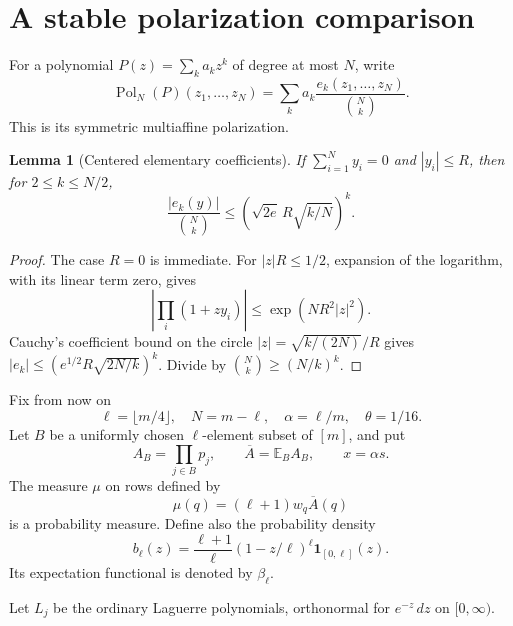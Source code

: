\documentclass[11pt]{article}
\newtheorem{lemma}{Lemma}
\newcommand{\E}{\mathbb E}
\newcommand{\Pol}{\operatorname{Pol}}
\begin{document}
\section*{A stable polarization comparison}
For a polynomial $P(z)=\sum_k a_kz^k$ of degree at most $N$, write
\[
 \Pol_N(P)(z_1,\ldots,z_N)
    =\sum_k a_k\frac{e_k(z_1,\ldots,z_N)}{\binom Nk}.
\]
This is its symmetric multiaffine polarization.

\begin{lemma}[Centered elementary coefficients]\label{elementary}
If $\sum_{i=1}^Ny_i=0$ and $|y_i|\le R$, then for $2\le k\le N/2$,
\[
 \frac{|e_k(y)|}{\binom Nk}
       \le \left(\sqrt{2e}\,R\sqrt{k/N}\right)^k.
\]
\end{lemma}
\begin{proof}
The case $R=0$ is immediate. For $|z|R\le1/2$, expansion of the
logarithm, with its linear term zero, gives
\[
 \left|\prod_i(1+zy_i)\right|\le \exp(NR^2|z|^2).
\]
Cauchy's coefficient bound on the circle
$|z|=\sqrt{k/(2N)}/R$ gives
$|e_k|\le(e^{1/2}R\sqrt{2N/k})^k$.
Divide by $\binom Nk\ge(N/k)^k$.
\end{proof}

Fix from now on
\[
 \ell=\lfloor m/4\rfloor,\quad N=m-\ell,\quad
 \alpha=\ell/m,\quad \theta=1/16.
\]
Let $B$ be a uniformly chosen $\ell$-element subset of $[m]$, and put
\[
 A_B=\prod_{j\in B}p_j,\qquad \overline A=\E_B A_B,
 \qquad x=\alpha s.
\]
The measure $\mu$ on rows defined by
\[
 \mu(q)=(\ell+1)w_q\overline A(q)
\]
is a probability measure. Define also the probability density
\[
 b_\ell(z)=\frac{\ell+1}{\ell}(1-z/\ell)^\ell
                 \boldsymbol1_{[0,\ell]}(z).
\]
Its expectation functional is denoted by $\beta_\ell$.

Let $L_j$ be the ordinary Laguerre polynomials, orthonormal for
$e^{-z}\,dz$ on $[0,\infty)$.
\end{document}
